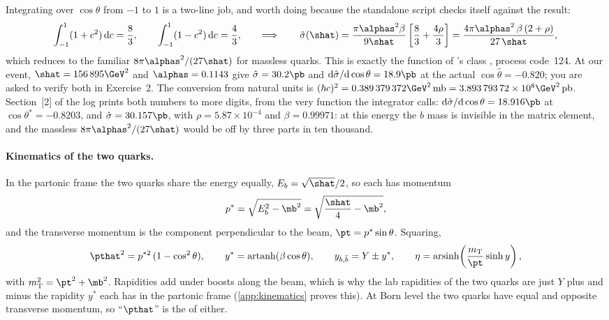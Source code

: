 Integrating over $\cos\theta$ from $-1$ to $1$ is a two-line job, and worth
doing because the standalone script checks itself against the result:
\begin{equation}
  \int_{-1}^{1}(1+c^2)\,\mathrm{d}c=\frac83,\qquad
  \int_{-1}^{1}(1-c^2)\,\mathrm{d}c=\frac43,\qquad\Longrightarrow\qquad
  \hat\sigma(\shat) = \frac{\pi\alphas^2\beta}{9\shat}\left[\frac83+\frac{4\rho}{3}\right]
  = \frac{4\pi\alphas^2\,\beta\,(2+\rho)}{27\,\shat},
  \label{eq:ancestral_home:sigmahat}
\end{equation}
which reduces to the familiar $8\pi\alphas^2/(27\shat)$ for massless quarks.
This is exactly the function  of \PYTHIA's class
, process code~124. At our event,
$\shat=156\,895\GeV^2$ and $\alphas=0.1143$ give $\hat\sigma=30.2\pb$ and
$\mathrm{d}\hat\sigma/\mathrm{d}\cos\theta=18.9\pb$ at the actual
$\cos\hat\theta=-0.820$; you are asked to verify both in Exercise~2. The
conversion from natural units is
$(\hbar c)^2 = 0.389\,379\,372\GeV^2\,\mathrm{mb} = 3.893\,793\,72\times10^{8}\GeV^2\,\mathrm{pb}$.
Section~[2] of the log prints both numbers to more digits, from the very
function the integrator calls: $\mathrm{d}\hat\sigma/\mathrm{d}\cos\theta=18.916\pb$
at $\cos\theta^*=-0.8203$, and $\hat\sigma=30.157\pb$, with $\rho=5.87\times10^{-4}$
and $\beta=0.99971$: at this energy the $b$ mass is invisible in the matrix
element, and the massless $8\pi\alphas^2/(27\shat)$ would be off by three
parts in ten thousand.

\paragraph{Kinematics of the two quarks.} In the partonic frame the two
quarks share the energy equally, $E_b=\sqrt{\shat}/2$, so each has momentum
\begin{equation}
  p^{*}=\sqrt{E_b^2-\mb^2}=\sqrt{\frac{\shat}{4}-\mb^2},
  \label{eq:ancestral_home:pstar}
\end{equation}
and the transverse momentum is the component perpendicular to the beam,
$\pt=p^{*}\sin\theta$. Squaring,
\begin{equation}
  \pthat^2 = p^{*2}\,(1-\cos^2\theta),\qquad
  y^{*} = \operatorname{artanh}(\beta\cos\theta),\qquad
  y_{b,\bar b} = Y \pm y^{*},\qquad
  \eta = \operatorname{arsinh}\!\left(\frac{m_{\mathrm{T}}}{\pt}\sinh y\right),
  \label{eq:ancestral_home:kinematics}
\end{equation}
with $m_{\mathrm{T}}^2=\pt^2+\mb^2$. Rapidities add under boosts along the
beam, which is why the lab rapidities of the two quarks are just $Y$ plus and
minus the rapidity $y^{*}$ each has in the partonic frame
(\cref{app:kinematics} proves this). At Born level the two quarks have equal
and opposite transverse momentum, so ``$\pthat$'' is the \pt of either.

